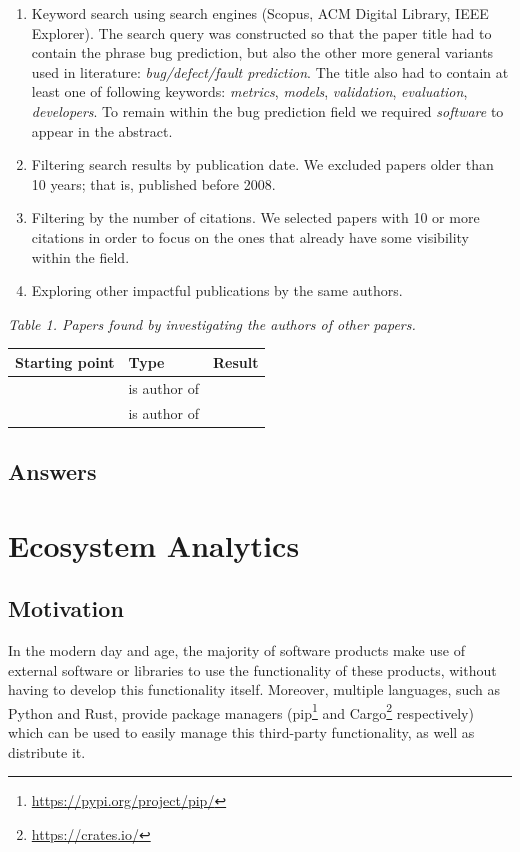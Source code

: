 \documentclass[]{book}
\let\rmarkdownfootnote\footnote%
\def\footnote{\protect\rmarkdownfootnote}
\begin{document}
\begin{enumerate}
\def\labelenumi{\arabic{enumi}.}
\item
  Keyword search using search engines (Scopus, ACM Digital Library, IEEE
  Explorer). The search query was constructed so that the paper title
  had to contain the phrase bug prediction, but also the other more
  general variants used in literature: \emph{bug/defect/fault
  prediction}. The title also had to contain at least one of following
  keywords: \emph{metrics}, \emph{models}, \emph{validation},
  \emph{evaluation}, \emph{developers}. To remain within the bug
  prediction field we required \emph{software} to appear in the
  abstract.
\item
  Filtering search results by publication date. We excluded papers older
  than 10 years; that is, published before 2008.
\item
  Filtering by the number of citations. We selected papers with 10 or
  more citations in order to focus on the ones that already have some
  visibility within the field.
\item
  Exploring other impactful publications by the same authors.
\end{enumerate}

\emph{Table 1. Papers found by investigating the authors of other
papers.}

\begin{longtable}[]{@{}lll@{}}
\toprule
Starting point & Type & Result\tabularnewline
\midrule
\endhead
\citet{DAmbros2010} & is author of & \citet{DAmbros2012}\tabularnewline
\citet{Catal2009review} & is author of & \citet{Catal2011}
\citet{Catal2009investigating}\tabularnewline
\bottomrule
\end{longtable}

\section{Answers}\label{answers-1}

\chapter{Ecosystem Analytics}\label{ecosystem-analytics}

\section{Motivation}\label{motivation-3}

In the modern day and age, the majority of software products make use of
external software or libraries to use the functionality of these
products, without having to develop this functionality itself. Moreover,
multiple languages, such as Python and Rust, provide package managers
(pip\footnote{\url{https://pypi.org/project/pip/}} and Cargo\footnote{\url{https://crates.io/}}
respectively) which can be used to easily manage this third-party
functionality, as well as distribute it.
\end{document}
